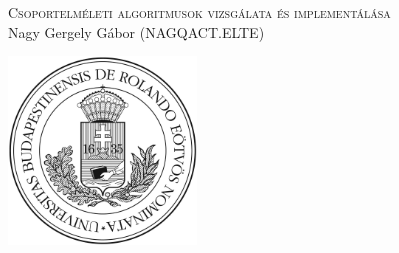 \begin{center}

\textsc{Csoportelméleti algoritmusok vizsgálata és implementálása}\\[1.5cm]
Nagy Gergely Gábor (NAGQACT.ELTE)\\[5cm]

\vspace{10cm}

\includegraphics[width=5cm]{cimlap/elte_cimer_ff}

\end{center}

\thispagestyle{empty}
\clearpage
